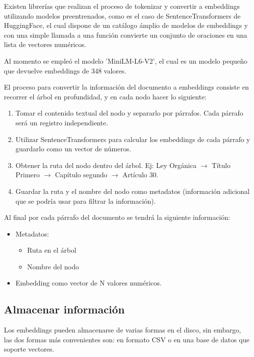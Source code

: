 Existen librerías que realizan el proceso de tokenizar y convertir a
embeddings utilizando modelos preentrenados, como es el caso de
SentenceTransformers de HuggingFace, el cual dispone de un catálogo ámplio
de modelos de embeddings y con una simple llamada a una función convierte
un conjunto de oraciones en una lista de vectores numéricos.

Al momento se empleó el modelo 'MiniLM-L6-V2', el cual es un modelo pequeño que
devuelve embeddings de 348 valores.

El proceso para convertir la información del documento a embeddings consiste
en recorrer el árbol en profundidad, y en cada nodo hacer lo siguiente:

\begin{enumerate}
    \item Tomar el contenido textual del nodo y separarlo por párrafos.
          Cada párrafo será un registro independiente.
    \item Utilizar SentenceTransformers para calcular los embeddings de cada
          párrafo y guardarlo como un vector de números.
    \item Obtener la ruta del nodo dentro del árbol. Ej: Ley Orgánica $\rightarrow$
          Título Primero $\rightarrow$ Capítulo segundo $\rightarrow$ Artículo 30.
    \item Guardar la ruta y el nombre del nodo como metadatos (información
          adicional que se podría usar para filtrar la información).
\end{enumerate}

Al final por cada párrafo del documento se tendrá la siguiente información:

\begin{itemize}
    \item Metadatos:
          \begin{itemize}
              \item Ruta en el árbol
              \item Nombre del nodo
          \end{itemize}
    \item Embedding como vector de N valores numéricos.
\end{itemize}

\subsection{Almacenar información}

Los embeddings pueden almacenarse de varias formas en el disco, sin embargo,
las dos formas más convenientes son: en formato CSV o en una base de datos
que soporte vectores.

